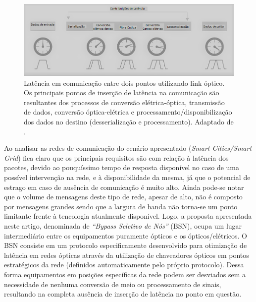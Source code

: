 \documentclass[12pt]{article}
\begin{document}
\begin{figure} %
	\centering
	\includegraphics[width=12cm]{latency_link}
	\caption{Latência em comunicação entre dois pontos utilizando link óptico. Os principais pontos de inserção de latência na comunicação são resultantes dos processos de conversão elétrica-óptica, transmissão de dados, conversão óptica-elétrica e processamento/disponibilização dos dados no destino (desserialização e processamento). Adaptado de \cite{Art_Coffey}.}
	\label{fig_latency_link}
\end{figure}

Ao analisar as redes de comunicação do cenário apresentado (\emph{Smart Cities/Smart Grid}) fica claro que os principais requisitos são com relação à latência dos pacotes, devido ao pouquíssimo tempo de resposta disponível no caso de uma possível intervenção na rede, e à disponibilidade da mesma, já que o potencial de estrago em caso de ausência de comunicação é muito alto. Ainda pode-se notar que o volume de mensagens deste tipo de rede, apesar de alto, não é composto por mensagens grandes sendo que a largura de banda não torna-se um ponto limitante frente à tencologia atualmente disponível. Logo, a proposta apresentada neste artigo, denominada de \emph{``Bypass Seletivo de Nós''} (BSN), ocupa um lugar intermediário entre os equipamentos puramente ópticos e os ópticos/elétricos. O BSN consiste em um protocolo especificamente desenvolvido para otimização de latência em redes ópticas através da utilização de chaveadores ópticos em pontos estratégicos da rede (definidos automaticamente pelo próprio protocolo). Dessa forma equipamentos em posições específicas da rede podem ser desviados sem a necessidade de nenhuma conversão de meio ou processamento de sinais, resultando na completa ausência de inserção de latência no ponto em questão. 
\end{document}
